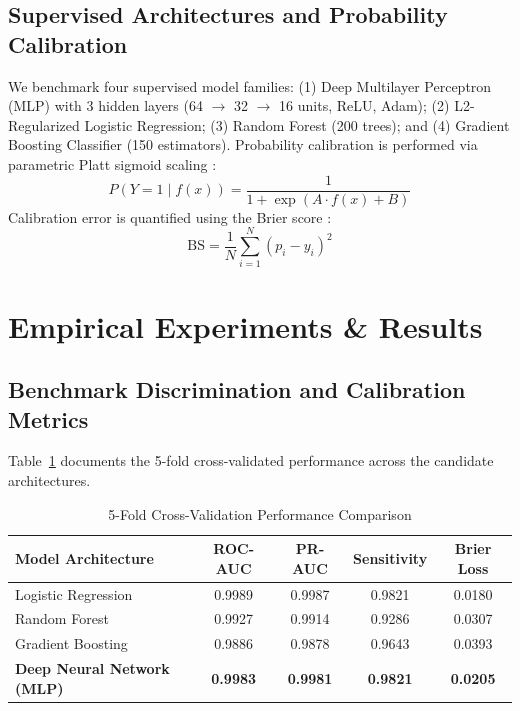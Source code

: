 \documentclass[journal,compsoc]{IEEEtran}
\begin{document}
\subsection{Supervised Architectures and Probability Calibration}
We benchmark four supervised model families: (1) Deep Multilayer Perceptron (MLP) with 3 hidden layers (64 $\to$ 32 $\to$ 16 units, ReLU, Adam); (2) L2-Regularized Logistic Regression; (3) Random Forest (200 trees); and (4) Gradient Boosting Classifier (150 estimators). Probability calibration is performed via parametric Platt sigmoid scaling \cite{platt1999probabilistic}:
\begin{equation}
P(Y=1 \mid f(x)) = \frac{1}{1 + \exp(A \cdot f(x) + B)}
\end{equation}
Calibration error is quantified using the Brier score \cite{brier1950verification}:
\begin{equation}
\text{BS} = \frac{1}{N} \sum_{i=1}^N (p_i - y_i)^2
\end{equation}

\section{Empirical Experiments \& Results}

\subsection{Benchmark Discrimination and Calibration Metrics}
Table~\ref{tab:cv} documents the 5-fold cross-validated performance across the candidate architectures.

\begin{table}[!t]
\centering
\caption{5-Fold Cross-Validation Performance Comparison}
\label{tab:cv}
\begin{tabular}{lcccc}
\toprule
\textbf{Model Architecture} & \textbf{ROC-AUC} & \textbf{PR-AUC} & \textbf{Sensitivity} & \textbf{Brier Loss} \\
\midrule
Logistic Regression & 0.9989 & 0.9987 & 0.9821 & 0.0180 \\
Random Forest & 0.9927 & 0.9914 & 0.9286 & 0.0307 \\
Gradient Boosting & 0.9886 & 0.9878 & 0.9643 & 0.0393 \\
\textbf{Deep Neural Network (MLP)} & \textbf{0.9983} & \textbf{0.9981} & \textbf{0.9821} & \textbf{0.0205} \\
\bottomrule
\end{tabular}
\end{table}
\end{document}
